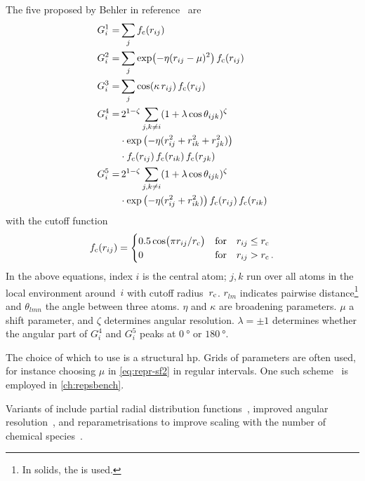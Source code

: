 The five \sfs proposed by Behler in reference~\cite{b2011Aq} are
%
\begin{align}
	G^1_i =& \sum_{j} \fcutoff(r_{ij})  \\
	G^2_i =& \sum_{j} \exp \bigl(-\eta (r_{ij}-\mu)^2 \bigr) \, \fcutoff(r_{ij}) \label{eq:repr-sf2}\\
	G^3_i =& \sum_{j} \cos ( \kappa \, r_{ij} ) \, \fcutoff(r_{ij}) \\
	G^4_i =& \,2^{1-\zeta} \sum_{j,k \neq i} (1 + \lambda \cos \theta_{ijk})^{\zeta}\notag\\
	       & \cdot \exp{\bigl(-\eta (r_{ij}^2 + r_{ik}^2 + r_{jk}^2)\bigr)} \\
	       & \cdot \fcutoff(r_{ij}) \, \fcutoff(r_{ik}) \, \fcutoff(r_{jk}) \notag\\
	G^5_i =& \,2^{1-\zeta} \sum_{j,k \neq i} (1 + \lambda \cos \theta_{ijk})^{\zeta} \notag\\
	       & \cdot \exp{\bigl( -\eta (r_{ij}^2 + r_{ik}^2) \bigr)} \, \fcutoff(r_{ij}) \, \fcutoff(r_{ik}) 
\end{align}
%
with the cutoff function
%
\begin{equation}
	f_{\text{c}}(r_{ij}) = \begin{cases}
		0.5 \cos \bigl(\pi r_{ij} / r_{\text{c}} \bigr) & \text{for}\quad r_{ij} \leq r_{\text{c}}\\
			0 & \text{for}\quad r_{ij} > r_{\text{c}} \, .\\
	\end{cases}
\end{equation}
In the above equations,
index $i$ is the central atom; $j, k$ run over all atoms in the local environment around~$i$ with cutoff radius~$r_{\text{c}}$.
$r_{lm}$ indicates pairwise distance\footnote{In solids, the \mic is used.} and $\theta_{lmn}$ the angle between three atoms.
$\eta$ and $\kappa$ are broadening parameters. $\mu$ a shift parameter, and $\zeta$ determines angular resolution. 
$\lambda{=}\pm 1$ determines whether the angular part of $G_i^4$ and $G_i^5$ peaks at $\SI{0}{\degree}$ or $\SI{180}{\degree}$. 

The choice of which \sfs to use is a structural \gls{hp}. Grids of parameters are often used, for instance choosing $\mu$ in \cref{eq:repr-sf2} in regular intervals. One such scheme~\cite{gsbm2018q} is employed in \cref{ch:repsbench}.

Variants of \sfs include partial radial distribution functions~\cite{sgmg2014q}, improved angular resolution~\cite{sir2017q}, and reparametrisations to improve scaling with the number of chemical species~\cite{gsbm2018q,rag2018q,auc2018q}.

